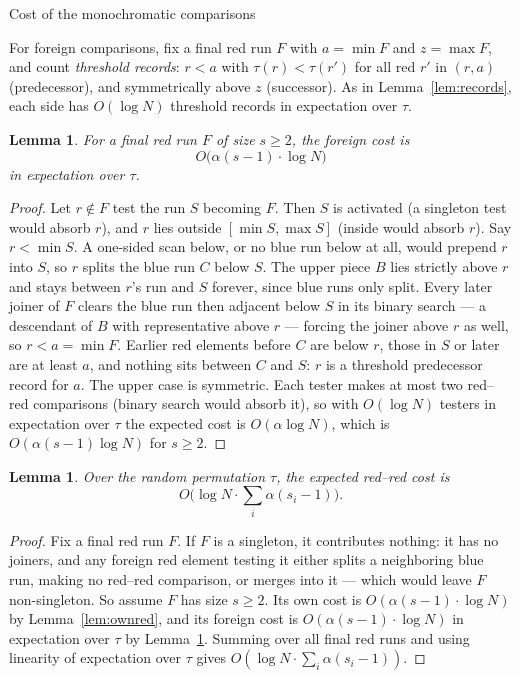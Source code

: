 \documentclass[11pt]{article}
\newtheorem{lem}[thm]{Lemma}
\theoremstyle{definition}
\numberwithin{equation}{section}
\begin{document}
\begin{section}{Cost of the monochromatic comparisons}
\begin{aiblock}
For foreign comparisons, fix a final red run $F$ with $a = \min F$
and $z = \max F$, and count {\em threshold records}: $r < a$ with
$\tau(r) < \tau(r')$ for all red $r'$ in $(r,a)$ (predecessor), and
symmetrically above $z$ (successor). As in Lemma~\ref{lem:records},
each side has $O(\log N)$ threshold records in expectation over
$\tau$.

\begin{lem}\label{lem:foreignred}
For a final red run $F$ of size $s \ge 2$, the foreign cost is
$$
O\big(\alpha(s-1)\cdot\log N\big)
$$
in expectation over $\tau$.
\end{lem}
\begin{proof}
Let $r \notin F$ test the run $S$ becoming $F$. Then $S$ is
activated (a singleton test would absorb $r$), and $r$ lies outside
$[\min S, \max S]$ (inside would absorb $r$). Say $r < \min S$.
A one-sided scan below, or no blue run below at all, would prepend $r$ into $S$, so $r$ splits
the blue run $C$ below $S$. The upper piece $B$ lies strictly above $r$ and stays between $r$'s run and $S$ forever, since blue runs only split. Every later joiner of $F$ clears the blue run then adjacent below $S$ in its binary search --- a descendant of $B$ with representative above $r$ --- forcing the joiner above $r$ as well, so $r < a = \min F$. Earlier red elements before $C$ are below
$r$, those in $S$ or later are at least $a$, and nothing sits
between $C$ and $S$: $r$ is a threshold predecessor record for $a$.
The upper case is symmetric. Each tester makes at most two red--red
comparisons (binary search would absorb it), so with $O(\log N)$
testers in expectation over $\tau$ the expected cost is
$O(\alpha\log N)$, which is $O(\alpha(s-1)\log N)$ for $s \ge 2$.
\end{proof}

\begin{lem}\label{lem:redtotal}
Over the random permutation $\tau$, the expected red--red cost is
$$
O\Big(\log N\cdot\sum_i \alpha(s_i-1)\Big).
$$
\end{lem}
\begin{proof}
Fix a final red run $F$. If $F$ is a singleton, it contributes
nothing: it has no joiners, and any foreign red element testing it either
splits a neighboring blue run, making no red--red comparison, or
merges into it --- which would leave $F$ non-singleton. So assume
$F$ has size $s \ge 2$. Its own cost is $O(\alpha(s-1)\cdot\log N)$ by
Lemma~\ref{lem:ownred}, and its foreign cost is $O(\alpha(s-1)\cdot\log N)$ in expectation over $\tau$ by Lemma~\ref{lem:foreignred}.
Summing over all final red runs and using linearity of expectation
over $\tau$ gives $O(\log N\cdot\sum_i \alpha(s_i-1))$.
\end{proof}
\end{aiblock}
\end{section}
\end{document}
